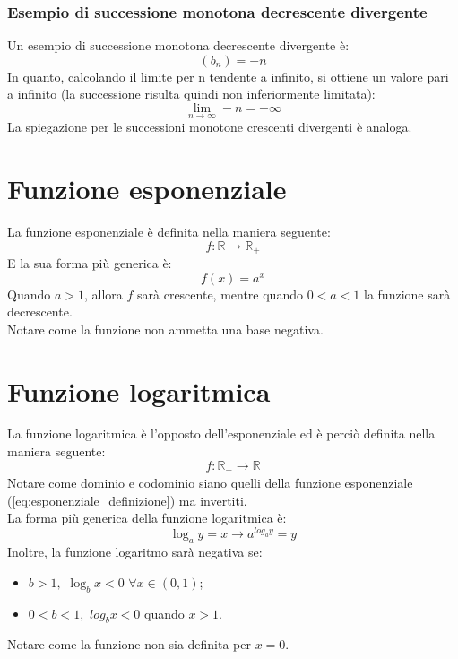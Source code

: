 \documentclass[12pt]{article}
\begin{document}
\subsubsection{Esempio di successione monotona decrescente divergente}
Un esempio di successione monotona decrescente divergente è:
\[
    (b_n) = -n
\]
In quanto, calcolando il limite per n tendente a infinito, si ottiene un valore pari a infinito (la successione risulta quindi \underline{non} inferiormente limitata): 
\[
    \lim_{n\to\infty} -n = -\infty
\]
La spiegazione per le successioni monotone crescenti divergenti è analoga.
\pagebreak
\section{Funzione esponenziale}
La funzione esponenziale è definita nella maniera seguente:
\begin{equation}
    f: \mathbb{R} \rightarrow \mathbb{R_+} \label{eq:esponenziale_definizione}
\end{equation}
E la sua forma più generica è:
\begin{equation}
    f(x) = a^x \label{eq:esponenziale_generica}
\end{equation}
Quando $a > 1$, allora $f$ sarà crescente, mentre quando $0 < a < 1$ la funzione sarà decrescente.\\
Notare come la funzione non ammetta una base negativa.
\section{Funzione logaritmica}
La funzione logaritmica è l'opposto dell'esponenziale ed è perciò definita nella maniera seguente:
\begin{equation}
    f: \mathbb{R_+} \rightarrow \mathbb{R} \label{eq:logaritmica_definizione}
\end{equation}
Notare come dominio e codominio siano quelli della funzione esponenziale (\ref{eq:esponenziale_definizione}) ma invertiti.\\
La forma più generica della funzione logaritmica è:
\begin{equation}
    \log_a{y} = x \rightarrow a^{log_a{y}} = y \label{eq:logaritmica_generica}
\end{equation}
Inoltre, la funzione logaritmo sarà negativa se:
\begin{itemize}
    \item $b > 1,$ $\log_b{x} < 0$ $\forall x \in (0, 1)$;
    \item $0 < b < 1,$ $log_b{x} < 0$ quando $x > 1$.
\end{itemize}
Notare come la funzione non sia definita per $x = 0$.
\end{document}
